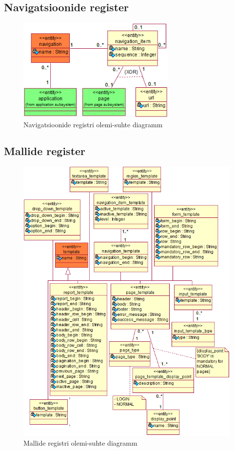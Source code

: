 \documentclass[a4paper,12pt]{article} %
\begin{document}
\pagebreak

\subsection*{Navigatsioonide register}
\begin{figure}[H]
\centering
\includegraphics[width=0.7\textwidth]{./diagrams/navigation-er-diagram.png}
\caption{Navigatsioonide registri olemi-suhte diagramm}
\label{fig_navigatsioonide_registri_olemi_suhte_diagramm}
\end{figure}

\subsection*{Mallide register}
\begin{figure}[H]
\centering
\includegraphics[width=\textwidth]{./diagrams/template-er-diagram.png}
\caption{Mallide registri olemi-suhte diagramm}
\label{fig_mallide_registri_olemi_suhte_diagramm}
\end{figure}
\end{document}
